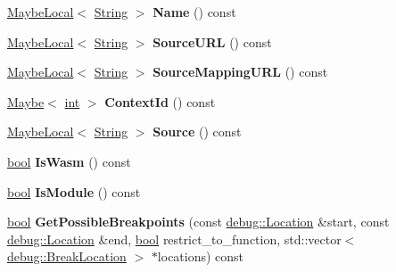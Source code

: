 \begin{DoxyCompactItemize}
\mbox{\hyperlink{classv8_1_1MaybeLocal}{Maybe\+Local}}$<$ \mbox{\hyperlink{classv8_1_1String}{String}} $>$ {\bfseries Name} () const
\item 
\mbox{\label{classv8_1_1debug_1_1Script_a5586cf46d20b8ed3143b17cf74dad69a}} 
\mbox{\hyperlink{classv8_1_1MaybeLocal}{Maybe\+Local}}$<$ \mbox{\hyperlink{classv8_1_1String}{String}} $>$ {\bfseries Source\+U\+RL} () const
\item 
\mbox{\label{classv8_1_1debug_1_1Script_af57956fb0d02de53a3fcbc330916ce79}} 
\mbox{\hyperlink{classv8_1_1MaybeLocal}{Maybe\+Local}}$<$ \mbox{\hyperlink{classv8_1_1String}{String}} $>$ {\bfseries Source\+Mapping\+U\+RL} () const
\item 
\mbox{\label{classv8_1_1debug_1_1Script_a8ea150d89286fb69fcb018b5865b7596}} 
\mbox{\hyperlink{classv8_1_1Maybe}{Maybe}}$<$ \mbox{\hyperlink{classint}{int}} $>$ {\bfseries Context\+Id} () const
\item 
\mbox{\label{classv8_1_1debug_1_1Script_a699e7f86e547d25a9ffa4efca179567e}} 
\mbox{\hyperlink{classv8_1_1MaybeLocal}{Maybe\+Local}}$<$ \mbox{\hyperlink{classv8_1_1String}{String}} $>$ {\bfseries Source} () const
\item 
\mbox{\label{classv8_1_1debug_1_1Script_a427cb4c8dbd3bbce72e748677755baa9}} 
\mbox{\hyperlink{classbool}{bool}} {\bfseries Is\+Wasm} () const
\item 
\mbox{\label{classv8_1_1debug_1_1Script_a5a9ce806e43ad47e5bcd524fe6aeb18d}} 
\mbox{\hyperlink{classbool}{bool}} {\bfseries Is\+Module} () const
\item 
\mbox{\label{classv8_1_1debug_1_1Script_a8bf49aee5ffff760f8aa650290f82897}} 
\mbox{\hyperlink{classbool}{bool}} {\bfseries Get\+Possible\+Breakpoints} (const \mbox{\hyperlink{classv8_1_1debug_1_1Location}{debug\+::\+Location}} \&start, const \mbox{\hyperlink{classv8_1_1debug_1_1Location}{debug\+::\+Location}} \&end, \mbox{\hyperlink{classbool}{bool}} restrict\+\_\+to\+\_\+function, std\+::vector$<$ \mbox{\hyperlink{classv8_1_1debug_1_1BreakLocation}{debug\+::\+Break\+Location}} $>$ $\ast$locations) const

\end{DoxyCompactItemize}
